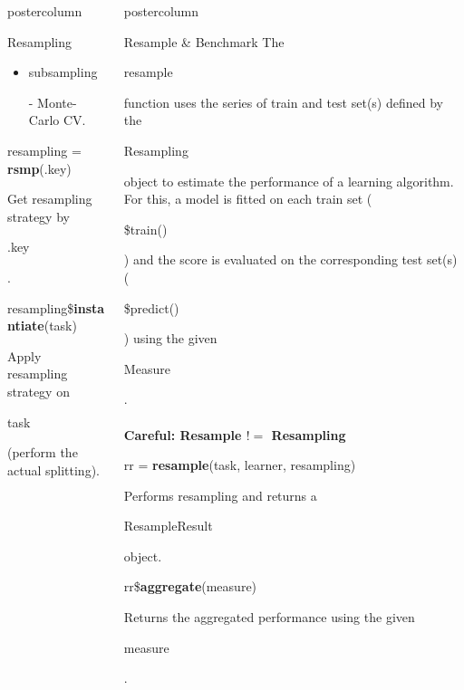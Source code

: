 \documentclass{beamer}
\newlength{\columnheight} %
\newcommand{\codeinline}[1]{\begin{codeboxinline}#1\end{codeboxinline}}
\begin{document}
\begin{frame}[fragile]{}
\begin{columns}
\begin{column}{.245\textwidth}
\begin{beamercolorbox}[center]{postercolumn}
\begin{minipage}{.98\textwidth}
{\begin{myblock}{Resampling}
\begin{itemize}
							\item \codeinline{subsampling} - Monte-Carlo CV.
						\end{itemize}
						\vspace{1em}
						\begin{codebox}
							resampling = \textbf{rsmp}(.key)
						\end{codebox}
						Get resampling strategy by \codeinline{.key}.
						\\
						\begin{codebox}
							resampling\$\textbf{instantiate}(task)
						\end{codebox}
						Apply resampling strategy on \codeinline{task} (perform
						the actual splitting).
					\end{myblock}
					}
				\end{minipage}
			\end{beamercolorbox}
		\end{column}
		\begin{column}{.245\textwidth}
			\begin{beamercolorbox}[center]{postercolumn}
				\begin{minipage}{.98\textwidth}
					\parbox[t][\columnheight]{\textwidth}{
						\begin{myblock}{Resample \& Benchmark}
							The \codeinline{resample} function uses the series
							of train and test set(s) defined by the
							\codeinline{Resampling} object to estimate the
							performance of a learning algorithm. For this, a
							model is fitted on each train set
							(\codeinline{\$train()}) and the score is evaluated
							on the corresponding test set(s)
							(\codeinline{\$predict()}) using the given
							\codeinline{Measure}.
							\\
							\\
							\textbf{Careful: Resample $!=$ Resampling}
							\vspace{1em}
							\\
							\begin{codebox}
								rr = \textbf{resample}(task, learner, resampling)
							\end{codebox}
							Performs resampling and returns a \codeinline{ResampleResult} object.
							\\
							\vspace{1em}
							\begin{codebox}
								rr\$\textbf{aggregate}(measure)
							\end{codebox}
							Returns the aggregated performance using the given \codeinline{measure}.

\end{myblock}}
\end{minipage}
\end{beamercolorbox}
\end{column}
\end{columns}
\end{frame}
\end{document}
